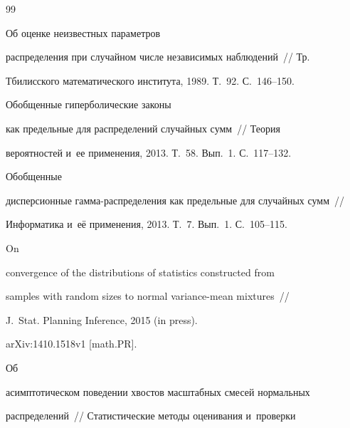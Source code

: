 {\small\frenchspacing


{\baselineskip=9.8pt




\begin{thebibliography}{99}




 Об оценке неизвестных параметров


распределения при случайном числе независимых наблюдений~/\!\!/ Тр.


Тбилисского математического института, 1989. Т.~92. С.~146--150.







 Обобщенные гиперболические законы


как предельные для распределений случайных сумм~/\!\!/ Теория


вероятностей и~ее применения, 2013. Т.~58. Вып.~1. С.~117--132.







 Обобщенные


дисперсионные гам\-ма-рас\-пре\-де\-ле\-ния как предельные для случайных сумм~/\!\!/


Информатика и~её применения, 2013. Т.~7. Вып.~1. С.~105--115.







 On


convergence of the distributions of statistics constructed from


samples with random sizes to normal variance-mean mixtures~/\!\!/


J.~Stat. Planning Inference, 2015 (in press).


arXiv:1410.1518v1 [math.PR].







 Об


асимптотическом поведении хвостов масштабных смесей нормальных


распределений~/\!\!/ Статистические методы оценивания и~проверки



\end{thebibliography}}}
